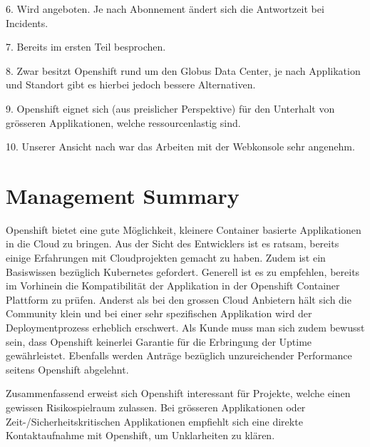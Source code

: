 \documentclass[12pt,a4paper]{article}
\begin{document}
6. Wird angeboten. Je nach Abonnement ändert sich die Antwortzeit bei Incidents.

7. Bereits im ersten Teil besprochen.

8. Zwar besitzt Openshift rund um den Globus Data Center, je nach Applikation und Standort gibt es hierbei jedoch bessere Alternativen.

9. Openshift eignet sich (aus preislicher Perspektive) für den Unterhalt von grösseren Applikationen, welche ressourcenlastig sind.

10. Unserer Ansicht nach war das Arbeiten mit der Webkonsole sehr angenehm.

\section{Management Summary}

Openshift bietet eine gute Möglichkeit, kleinere Container basierte Applikationen in die Cloud zu bringen. Aus der Sicht des Entwicklers
ist es ratsam, bereits einige Erfahrungen mit Cloudprojekten gemacht zu haben. Zudem ist ein Basiswissen bezüglich Kubernetes gefordert.
Generell ist es zu empfehlen, bereits im Vorhinein die Kompatibilität der Applikation in der Openshift Container Plattform zu prüfen.
Anderst als bei den grossen Cloud Anbietern hält sich die Community klein und bei einer sehr spezifischen Applikation wird der Deploymentprozess
erheblich erschwert. Als Kunde muss man sich zudem bewusst sein, dass Openshift keinerlei Garantie für die Erbringung der Uptime gewährleistet.
Ebenfalls werden Anträge bezüglich unzureichender Performance seitens Openshift abgelehnt.


Zusammenfassend erweist sich Openshift interessant für Projekte, welche einen gewissen Risikospielraum zulassen. Bei grösseren Applikationen oder
Zeit-/Sicherheitskritischen Applikationen empfiehlt sich eine direkte Kontaktaufnahme mit Openshift, um Unklarheiten zu klären.
    
\end{document}
